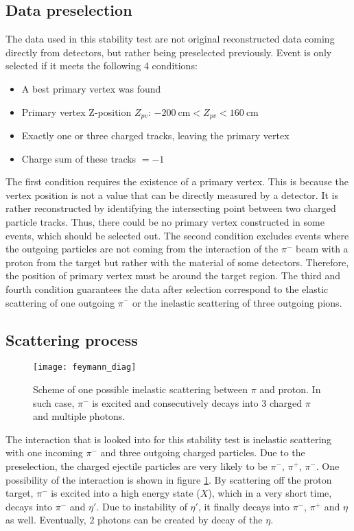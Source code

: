 \subsection{Data preselection}
\label{subsec:data_preselection}
The data used in this stability test are not original reconstructed data coming directly from detectors, but rather being preselected previously. Event is only selected if it meets the following 4 conditions: 
\begin{itemize}
	\item A best primary vertex was found
	\item Primary vertex Z-position $Z_{pv}$: $\SI{-200}{\centi\meter} < Z_{pv} < \SI{160}{\centi\meter}$
	\item Exactly one or three charged tracks, leaving the primary vertex
	\item Charge sum of these tracks $= -1$
\end{itemize}
The first condition requires the existence of a primary vertex. This is because the vertex position is not a value that can be directly measured by a detector. It is rather reconstructed by identifying the intersecting point between two charged particle tracks. Thus, there could be no primary vertex constructed in some events, which should be selected out. The second condition excludes events where the outgoing particles are not coming from the interaction of the $\pi^-$ beam with a proton from the target but rather with the material of some detectors. Therefore, the position of primary vertex must be around the target region. The third and fourth condition guarantees the data after selection correspond to the elastic scattering of one outgoing $\pi^-$ or the inelastic scattering of three outgoing pions.

\subsection{Scattering process}
\label{subsec:photon}
\begin{figure}[thb]
	\centering
	\texttt{[image: feymann\_diag]}
	\caption{Scheme of one possible inelastic scattering between $\pi$ and proton. In such case, $\pi^-$ is excited and consecutively decays into 3 charged $\pi$ and multiple photons.}
	\label{fig:feymann_diag}
\end{figure}

The interaction that is looked into for this stability test is inelastic scattering with one incoming $\pi^-$ and three outgoing charged particles. Due to the preselection, the charged ejectile particles are very likely to be $\pi^-$, $\pi^+$, $\pi^-$.  One possibility of the interaction is shown in figure \ref{fig:feymann_diag}. By scattering off the proton target, $\pi^-$ is excited into a high energy state ($X$), which in a very short time, decays into $\pi^-$ and $\eta'$. Due to instability of $\eta'$, it finally decays into $\pi^-$, $\pi^+$ and $\eta$ as well. Eventually, 2 photons can be created by decay of the $\eta$.
